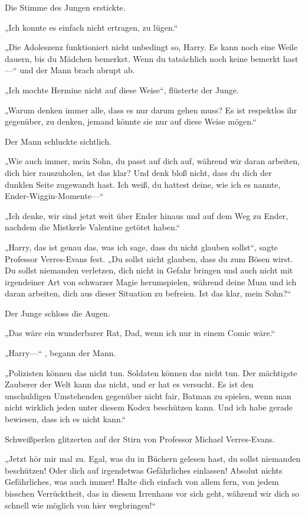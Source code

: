 {Die Stimme des Jungen erstickte.

„Ich konnte es einfach nicht ertragen, zu lügen.“

„Die Adoleszenz funktioniert nicht unbedingt so, Harry. Es kann noch eine Weile dauern, bis du Mädchen bemerkst. Wenn du tatsächlich noch keine bemerkt hast—“ und der Mann brach abrupt ab.

„Ich mochte Hermine nicht auf diese Weise“, flüsterte der Junge.

„Warum denken immer alle, dass es nur darum gehen muss? Es ist respektlos ihr gegenüber, zu denken, jemand könnte sie nur auf diese Weise mögen.“

Der Mann schluckte sichtlich.

„Wie auch immer, mein Sohn, du passt auf dich auf, während wir daran arbeiten, dich hier rauszuholen, ist das klar? Und denk bloß nicht, dass du dich der dunklen Seite zugewandt hast. Ich weiß, du hattest deine, wie ich es nannte, Ender-Wiggin-Momente—“

„Ich denke, wir sind jetzt weit über Ender hinaus und auf dem Weg zu Ender, nachdem die Mistkerle Valentine getötet haben.“

„Harry, das ist genau das, was ich sage, dass du nicht glauben sollst“, sagte Professor Verres-Evans fest. „Du sollst nicht glauben, dass du zum Bösen wirst. Du sollst niemanden verletzen, dich nicht in Gefahr bringen und auch nicht mit irgendeiner Art von schwarzer Magie herumspielen, während deine Mum und ich daran arbeiten, dich aus dieser Situation zu befreien. Ist das klar, mein Sohn?“

Der Junge schloss die Augen.

„Das wäre ein wunderbarer Rat, Dad, wenn ich nur in einem Comic wäre.“

„Harry—“ , begann der Mann.

„Polizisten können das nicht tun. Soldaten können das nicht tun. Der mächtigste Zauberer der Welt kann das nicht, und er hat es versucht. Es ist den unschuldigen Umstehenden gegenüber nicht fair, Batman zu spielen, wenn man nicht wirklich jeden unter diesem Kodex beschützen kann. Und ich habe gerade bewiesen, dass ich es nicht kann.“

Schweißperlen glitzerten auf der Stirn von Professor Michael Verres-Evans.

„Jetzt hör mir mal zu. Egal, was du in Büchern gelesen hast, du sollst niemanden beschützen! Oder dich auf irgendetwas Gefährliches einlassen! Absolut nichts Gefährliches, was auch immer! Halte dich einfach von allem fern, von jedem bisschen Verrücktheit, das in diesem Irrenhaus vor sich geht, während wir dich so schnell wie möglich von hier wegbringen!“

}
